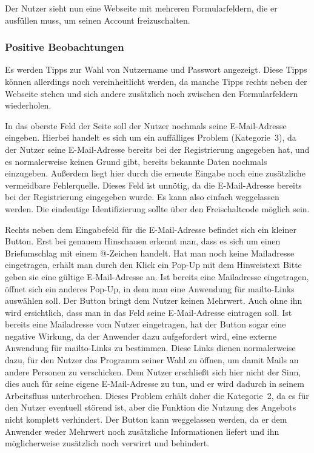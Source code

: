 Der Nutzer sieht nun eine Webseite mit mehreren Formularfeldern, die er ausfüllen muss, um seinen Account freizuschalten.

\subsubsection*{Positive Beobachtungen}
\label{subsubsec:freischaltung_webseite_positiv}
Es werden Tipps zur Wahl von Nutzername und Passwort angezeigt. Diese Tipps können allerdings noch vereinheitlicht werden, da manche Tipps rechts neben der Webseite stehen und sich andere zusätzlich noch zwischen den Formularfeldern wiederholen.

{
In das oberste Feld der Seite soll der Nutzer nochmals seine E\hbox{-}Mail-Adresse eingeben.
}
{
Hierbei handelt es sich um ein auffälliges Problem (Kategorie~3), da der Nutzer seine E\hbox{-}Mail-Adresse bereits bei der Registrierung angegeben hat, und es normalerweise keinen Grund gibt, bereits bekannte Daten nochmals einzugeben. Außerdem liegt hier durch die erneute Eingabe noch eine zusätzliche vermeidbare Fehlerquelle.
}
{
Dieses Feld ist unnötig, da die E\hbox{-}Mail-Adresse bereits bei der Registrierung eingegeben wurde. Es kann also einfach weggelassen werden. Die eindeutige Identifizierung sollte über den Freischaltcode möglich sein.
}
\label{prob:frei:emaileingabe}

{
Rechts neben dem Eingabefeld für die E\hbox{-}Mail-Adresse befindet sich ein kleiner Button. Erst bei genauem Hinschauen erkennt man, dass es sich um einen Briefumschlag mit einem @-Zeichen handelt. Hat man noch keine Mailadresse eingetragen, erhält man durch den Klick ein Pop-Up mit dem Hinweistext \glqq Bitte geben sie eine gültige E\hbox{-}Mail-Adresse an\grqq . Ist bereits eine Mailadresse eingetragen, öffnet sich ein anderes Pop-Up, in dem man eine Anwendung für mailto-Links auswählen soll.
}
{
Der Button bringt dem Nutzer keinen Mehrwert. Auch ohne ihn wird ersichtlich, dass man in das Feld seine E\hbox{-}Mail-Adresse eintragen soll. Ist bereits eine Mailadresse vom Nutzer eingetragen, hat der Button sogar eine negative Wirkung, da der Anwender dazu aufgefordert wird, eine externe Anwendung für mailto-Links zu bestimmen. Diese Links dienen normalerweise dazu, für den Nutzer das Programm seiner Wahl zu öffnen, um damit Mails an andere Personen zu verschicken. Dem Nutzer erschließt sich hier nicht der Sinn, dies auch für seine eigene E\hbox{-}Mail-Adresse zu tun, und er wird dadurch in seinem Arbeitsfluss unterbrochen. Dieses Problem erhält daher die Kategorie~2, da es für den Nutzer eventuell störend ist, aber die Funktion die Nutzung des Angebots nicht komplett verhindert.
}
{
Der Button kann weggelassen werden, da er dem Anwender weder Mehrwert noch zusätzliche Informationen liefert und ihn möglicherweise zusätzlich noch verwirrt und behindert.
}
\label{prob:frei:buttonmailto}

